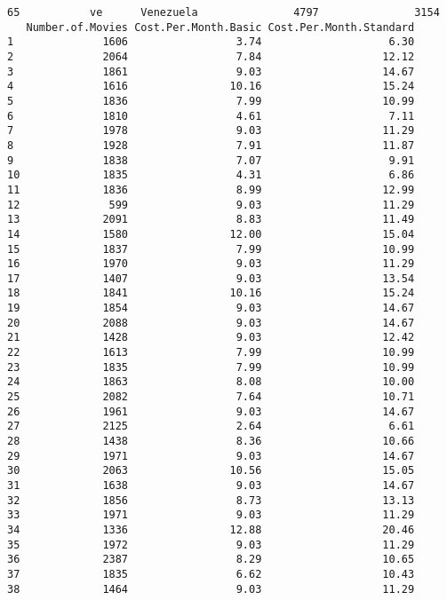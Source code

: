 \documentclass[
]{article}
\begin{document}
\begin{verbatim}
65           ve      Venezuela               4797               3154
   Number.of.Movies Cost.Per.Month.Basic Cost.Per.Month.Standard
1              1606                 3.74                    6.30
2              2064                 7.84                   12.12
3              1861                 9.03                   14.67
4              1616                10.16                   15.24
5              1836                 7.99                   10.99
6              1810                 4.61                    7.11
7              1978                 9.03                   11.29
8              1928                 7.91                   11.87
9              1838                 7.07                    9.91
10             1835                 4.31                    6.86
11             1836                 8.99                   12.99
12              599                 9.03                   11.29
13             2091                 8.83                   11.49
14             1580                12.00                   15.04
15             1837                 7.99                   10.99
16             1970                 9.03                   11.29
17             1407                 9.03                   13.54
18             1841                10.16                   15.24
19             1854                 9.03                   14.67
20             2088                 9.03                   14.67
21             1428                 9.03                   12.42
22             1613                 7.99                   10.99
23             1835                 7.99                   10.99
24             1863                 8.08                   10.00
25             2082                 7.64                   10.71
26             1961                 9.03                   14.67
27             2125                 2.64                    6.61
28             1438                 8.36                   10.66
29             1971                 9.03                   14.67
30             2063                10.56                   15.05
31             1638                 9.03                   14.67
32             1856                 8.73                   13.13
33             1971                 9.03                   11.29
34             1336                12.88                   20.46
35             1972                 9.03                   11.29
36             2387                 8.29                   10.65
37             1835                 6.62                   10.43
38             1464                 9.03                   11.29

\end{verbatim}
\end{document}
